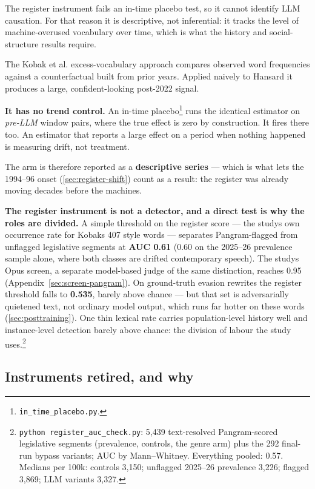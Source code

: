 The register instrument fails an in-time placebo test, so it cannot identify LLM causation. For that reason it is descriptive, not inferential: it tracks the level of machine-overused vocabulary over time, which is what the history and social-structure results require.

The Kobak et al. excess-vocabulary approach \cite{kobak2025} compares observed word frequencies against a
counterfactual built from prior years. Applied naively to Hansard it produces
a large, confident-looking post-2022 signal.

\textbf{It has no trend control.} An in-time placebo\footnote{\texttt{in\_time\_placebo.py}.} runs the identical estimator on \emph{pre-LLM} window pairs, where the true effect is zero by construction. It fires there too. An estimator that reports a large effect on a period when nothing happened is measuring drift, not treatment.

The arm is therefore reported as a \textbf{descriptive series} --- which is what lets
the 1994--96 onset (\cref{sec:register-shift}) count as a result: the register was already moving
decades before the machines.

\textbf{The register instrument is not a detector, and a direct test is why the
roles are divided.} A simple threshold on the register score --- the study\textquotesingle s
own occurrence rate for Kobak\textquotesingle s 407 style words --- separates Pangram-flagged
from unflagged legislative segments at \textbf{AUC 0.61} (0.60 on the 2025--26
prevalence sample alone, where both classes are drifted contemporary speech).
The study\textquotesingle s Opus screen, a separate model-based judge of the same distinction,
reaches 0.95 (Appendix~\ref{sec:screen-pangram}). On ground-truth evasion rewrites the register
threshold falls to \textbf{0.535}, barely above chance --- but that set is
adversarially quietened text, not ordinary model output, which runs far hotter
on these words (\cref{sec:posttraining}). One thin lexical rate carries population-level history
well and instance-level detection barely above chance: the division of labour
the study uses.\footnote{\texttt{python\ register\_\allowbreak{}auc\_\allowbreak{}check.\allowbreak{}py}: 5,439 text-resolved
  Pangram-scored legislative segments (prevalence, controls, the genre
  arm) plus the 292 final-run bypass variants; AUC by Mann--Whitney.
  Everything pooled: 0.57. Medians per 100k: controls 3,150; unflagged
  2025--26 prevalence 3,226; flagged 3,869; LLM variants 3,327.}

\subsection{Instruments retired, and why}\label{sec:retired}

